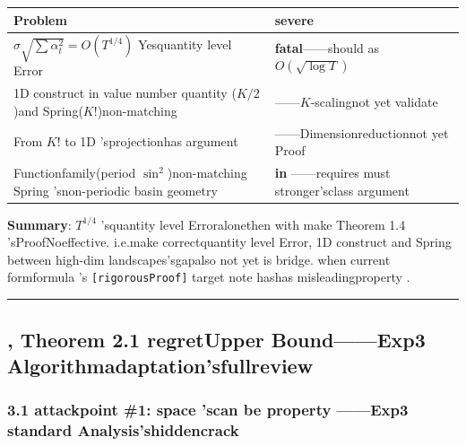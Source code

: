 \documentclass[
  12pt,
]{article}
\begin{document}
\begin{longtable}[]{@{}
  >{\raggedright\arraybackslash}p{}
  >{\raggedright\arraybackslash}p{}@{}}
\toprule\noalign{}
\begin{minipage}[b]{\linewidth}\raggedright
Problem
\end{minipage} & \begin{minipage}[b]{\linewidth}\raggedright
severe
\end{minipage} \\
\midrule\noalign{}
\endhead
\bottomrule\noalign{}
\endlastfoot
\(\sigma\sqrt{\sum\alpha_t^2} = O(T^{1/4})\) Yesquantity level Error &
\textbf{fatal}------should as  \(O(\sqrt{\log T})\) \\
1D construct in value number quantity (\(K/2\))and  Spring(\(K!\))non-matching &
\textbf{}------\(K\)-scalingnot yet validate  \\
From \(K!\) to  1D 'sprojectionhas argument & \textbf{}------Dimensionreductionnot yet Proof \\
Functionfamily(period \(\sin^2\))non-matching Spring 'snon-periodic basin geometry &
\textbf{in }------requires must stronger'sclass argument \\
\end{longtable}

\textbf{Summary}: \(T^{1/4}\) 'squantity level Erroralonethen with make  Theorem 1.4
'sProofNoeffective. i.e.make correctquantity level Error, 1D construct and  Spring
between high-dim landscapes'sgapalso not yet is bridge. when current formformula 's \texttt{{[}rigorousProof{]}}
target note hashas misleadingproperty . 

\begin{center}\rule{0.5\linewidth}{0.5pt}\end{center}

\subsection{, Theorem 2.1 regretUpper Bound------Exp3
Algorithmadaptation'sfullreview}\label{ux4e09theorem-2.1-ux9057ux61beux4e0aux754cexp3-ux7b97ux6cd5ux9002ux914dux7684ux5168ux9762ux5ba1ux67e5}

\subsubsection{3.1 attackpoint  \#1: space 'scan be property ------Exp3
standard Analysis'shiddencrack}\label{ux653bux51fbux70b9-1ux52a8ux4f5cux7a7aux95f4ux7684ux53efux53d8ux6027exp3-ux6807ux51c6ux5206ux6790ux7684ux9690ux85cfux88c2ux75d5}
\end{document}
